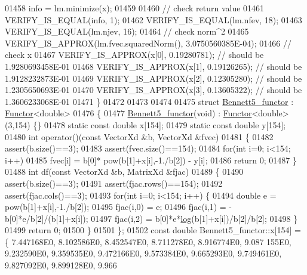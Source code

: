 \begin{DoxyCode}
01458   info = lm.minimize(x);
01459 
01460   \textcolor{comment}{// check return value}
01461   VERIFY\_IS\_EQUAL(info, 1);
01462   VERIFY\_IS\_EQUAL(lm.nfev, 18);
01463   VERIFY\_IS\_EQUAL(lm.njev, 16);
01464   \textcolor{comment}{// check norm^2}
01465   VERIFY\_IS\_APPROX(lm.fvec.squaredNorm(), 3.0750560385E-04);
01466   \textcolor{comment}{// check x}
01467   VERIFY\_IS\_APPROX(x[0], 0.19280781); \textcolor{comment}{// should be 1.9280693458E-01}
01468   VERIFY\_IS\_APPROX(x[1], 0.19126265); \textcolor{comment}{// should be 1.9128232873E-01}
01469   VERIFY\_IS\_APPROX(x[2], 0.12305280); \textcolor{comment}{// should be 1.2305650693E-01}
01470   VERIFY\_IS\_APPROX(x[3], 0.13605322); \textcolor{comment}{// should be 1.3606233068E-01}
01471 \}
01472 
01473 
01474 
01475 \textcolor{keyword}{struct }\hyperlink{struct_bennett5__functor}{Bennett5\_functor} : \hyperlink{struct_functor}{Functor}<double>
01476 \{
01477     \hyperlink{struct_bennett5__functor}{Bennett5\_functor}(\textcolor{keywordtype}{void}) : \hyperlink{struct_functor}{Functor}<double>(3,154) \{\}
01478     \textcolor{keyword}{static} \textcolor{keyword}{const} \textcolor{keywordtype}{double} x[154];
01479     \textcolor{keyword}{static} \textcolor{keyword}{const} \textcolor{keywordtype}{double} y[154];
01480     \textcolor{keywordtype}{int} operator()(\textcolor{keyword}{const} VectorXd &b, VectorXd &fvec)
01481     \{
01482         assert(b.size()==3);
01483         assert(fvec.size()==154);
01484         \textcolor{keywordflow}{for}(\textcolor{keywordtype}{int} i=0; i<154; i++)
01485             fvec[i] = b[0]* pow(b[1]+x[i],-1./b[2]) - y[i];
01486         \textcolor{keywordflow}{return} 0;
01487     \}
01488     \textcolor{keywordtype}{int} df(\textcolor{keyword}{const} VectorXd &b, MatrixXd &fjac)
01489     \{
01490         assert(b.size()==3);
01491         assert(fjac.rows()==154);
01492         assert(fjac.cols()==3);
01493         \textcolor{keywordflow}{for}(\textcolor{keywordtype}{int} i=0; i<154; i++) \{
01494             \textcolor{keywordtype}{double} e = pow(b[1]+x[i],-1./b[2]);
01495             fjac(i,0) = e;
01496             fjac(i,1) = - b[0]*e/b[2]/(b[1]+x[i]);
01497             fjac(i,2) = b[0]*e*\hyperlink{structlog}{log}(b[1]+x[i])/b[2]/b[2];
01498         \}
01499         \textcolor{keywordflow}{return} 0;
01500     \}
01501 \};
01502 \textcolor{keyword}{const} \textcolor{keywordtype}{double} Bennett5\_functor::x[154] = \{ 7.447168E0, 8.102586E0, 8.452547E0, 8.711278E0, 8.916774E0, 9.087
      155E0, 9.232590E0, 9.359535E0, 9.472166E0, 9.573384E0, 9.665293E0, 9.749461E0, 9.827092E0, 9.899128E0, 9.966

\end{DoxyCode}
